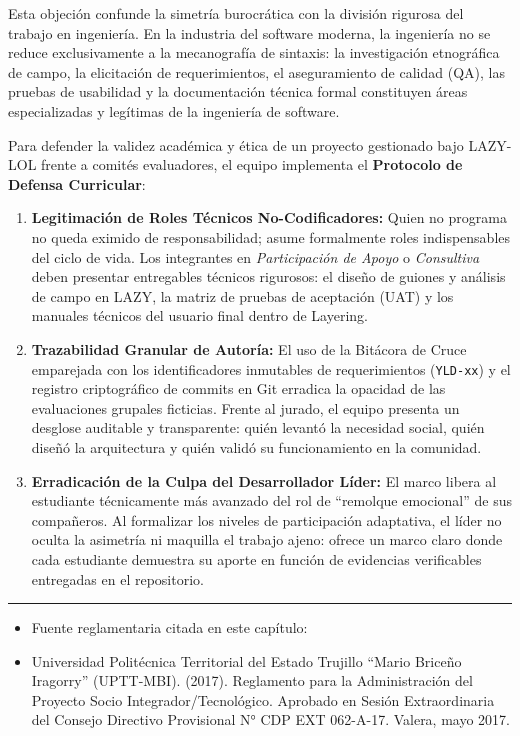 \documentclass[14pt,a4paper,oneside]{extbook}
\begin{document}
Esta objeción confunde la simetría burocrática con la división rigurosa del trabajo en ingeniería. En la industria del software moderna, la ingeniería no se reduce exclusivamente a la mecanografía de sintaxis: la investigación etnográfica de campo, la elicitación de requerimientos, el aseguramiento de calidad (QA), las pruebas de usabilidad y la documentación técnica formal constituyen áreas especializadas y legítimas de la ingeniería de software.

Para defender la validez académica y ética de un proyecto gestionado bajo LAZY-LOL frente a comités evaluadores, el equipo implementa el \textbf{Protocolo de Defensa Curricular}:

\begin{enumerate}
    \item \textbf{Legitimación de Roles Técnicos No-Codificadores:} Quien no programa no queda eximido de responsabilidad; asume formalmente roles indispensables del ciclo de vida. Los integrantes en \textit{Participación de Apoyo} o \textit{Consultiva} deben presentar entregables técnicos rigurosos: el diseño de guiones y análisis de campo en LAZY, la matriz de pruebas de aceptación (UAT) y los manuales técnicos del usuario final dentro de Layering.
    \item \textbf{Trazabilidad Granular de Autoría:} El uso de la Bitácora de Cruce emparejada con los identificadores inmutables de requerimientos (\texttt{YLD-xx}) y el registro criptográfico de commits en Git erradica la opacidad de las evaluaciones grupales ficticias. Frente al jurado, el equipo presenta un desglose auditable y transparente: quién levantó la necesidad social, quién diseñó la arquitectura y quién validó su funcionamiento en la comunidad.
    \item \textbf{Erradicación de la Culpa del Desarrollador Líder:} El marco libera al estudiante técnicamente más avanzado del rol de \enquote{remolque emocional} de sus compañeros. Al formalizar los niveles de participación adaptativa, el líder no oculta la asimetría ni maquilla el trabajo ajeno: ofrece un marco claro donde cada estudiante demuestra su aporte en función de evidencias verificables entregadas en el repositorio.
\end{enumerate}

\par\vspace{1.5em}\noindent\hfill\rule{0.25\textwidth}{0.6pt}\hfill\par\vspace{1.5em}
\begin{itemize}
\item Fuente reglamentaria citada en este capítulo:
\item Universidad Politécnica Territorial del Estado Trujillo \enquote{Mario Briceño Iragorry} (UPTT-MBI). (2017). Reglamento para la Administración del Proyecto Socio Integrador/Tecnológico. Aprobado en Sesión Extraordinaria del Consejo Directivo Provisional N° CDP EXT 062-A-17. Valera, mayo 2017.
\end{itemize}
\end{document}
